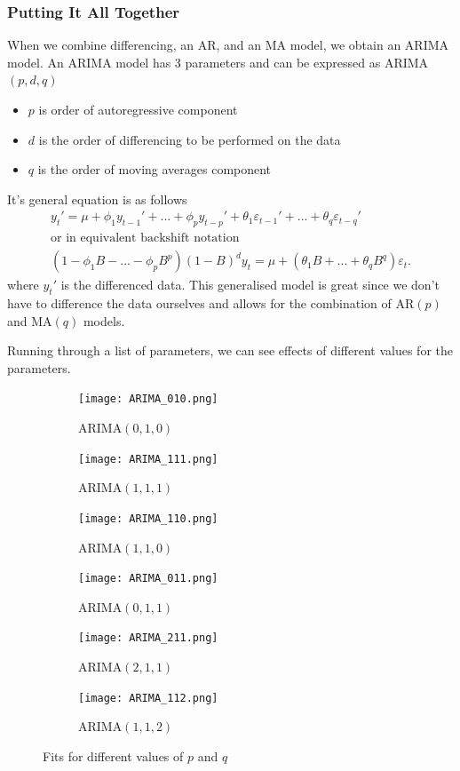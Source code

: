 \documentclass{article}
\begin{document}
  \subsubsection{Putting It All Together}
  When we combine differencing, an AR, and an MA model, we obtain an ARIMA model. An ARIMA model has 3 parameters and can be expressed as ARIMA$(p,d,q)$
  \begin{itemize}
    \item $p$ is order of autoregressive component
    \item $d$ is the order of differencing to be performed on the data
    \item $q$ is the order of moving averages component
  \end{itemize}
  It's general equation is as follows
  \begin{gather*}
    y_t' = \mu + \phi_1 y_{t-1}' + ... + \phi_p y_{t-p}' + \theta_1 \varepsilon_{t-1}' + ... + \theta_q \varepsilon_{t-q}'\\
    \text{or in equivalent backshift notation}\\
    (1 - \phi_1B - ... - \phi_pB^p)(1-B)^dy_t = \mu + (\theta_1B + ... + \theta_qB^q)\varepsilon_t.
  \end{gather*}
  where $y_t'$ is the differenced data. This generalised model is great since we don't have to difference the data ourselves and allows for the combination of AR$(p)$ and MA$(q)$ models.  

  Running through a list of parameters, we can see effects of different values for the parameters.

  \begin{figure}[H]
    \centering
    \captionsetup{justification=centering}
    \begin{subfigure}[b]{0.49\linewidth}
      \texttt{[image: ARIMA\_010.png]}
      \caption{ARIMA$(0, 1, 0)$}
    \end{subfigure}
    \begin{subfigure}[b]{0.49\linewidth}
      \texttt{[image: ARIMA\_111.png]}
      \caption{ARIMA$(1, 1, 1)$}
    \end{subfigure}
    \begin{subfigure}[b]{0.49\linewidth}
      \texttt{[image: ARIMA\_110.png]}
      \caption{ARIMA$(1, 1, 0)$}
    \end{subfigure}
    \begin{subfigure}[b]{0.49\linewidth}
      \texttt{[image: ARIMA\_011.png]}
      \caption{ARIMA$(0, 1, 1)$}
    \end{subfigure}
    \begin{subfigure}[b]{0.49\linewidth}
      \texttt{[image: ARIMA\_211.png]}
      \caption{ARIMA$(2, 1, 1)$}
    \end{subfigure}
    \begin{subfigure}[b]{0.49\linewidth}
      \texttt{[image: ARIMA\_112.png]}
      \caption{ARIMA$(1, 1, 2)$}
    \end{subfigure}
    \caption{Fits for different values of $p$ and $q$}
  \end{figure}
\end{document}
